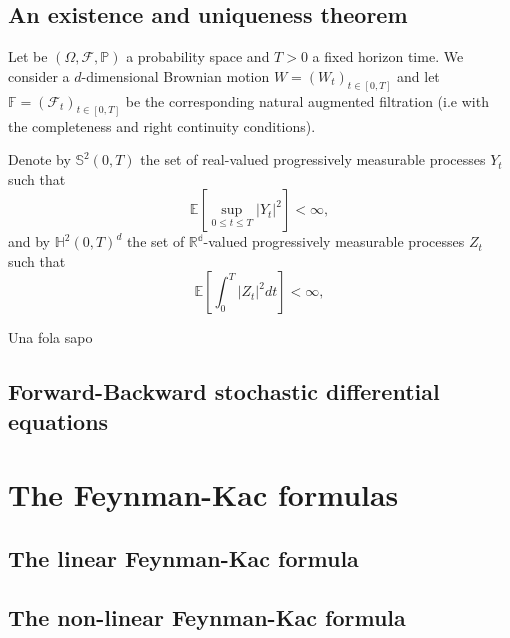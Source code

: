 \subsection{An existence and uniqueness theorem}
Let be $(\Omega,\mathcal{F},\mathbb{P})$ a probability space and $T>0$ a fixed horizon time. We consider a $d$-dimensional Brownian motion $W=(W_t)_{t\in [0,T]}$ and let $\mathbb{F}=(\mathcal{F}_t)_{t\in[0,T]}$ be the corresponding natural augmented filtration (i.e with the completeness and right continuity conditions).

Denote by $\mathbb{S}^2(0,T)$ the set of real-valued progressively measurable processes $Y_t$ such that 
\begin{equation}
	\mathbb{E}\left[\sup_{0\leq t \leq T}|Y_t|^2\right]<\infty,
\end{equation}  
and by $\mathbb{H}^2(0,T)^d$ the set of $\mathbb{R^d}$-valued progressively measurable processes $Z_t$ such that
\begin{equation}
	\mathbb{E}\left[\int_{0}^{T}|Z_t|^2 dt\right]<\infty,
\end{equation}
\begin{definition}
	Una fola sapo
\end{definition}
\subsection{Forward-Backward stochastic differential equations}
\section{The Feynman-Kac formulas}
\subsection{The linear Feynman-Kac formula}
\subsection{The non-linear Feynman-Kac formula}

 


